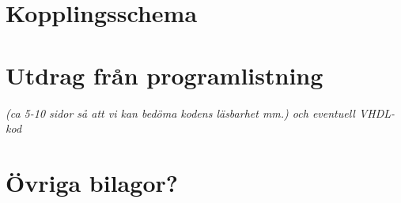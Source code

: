\section{Kopplingsschema}

\section{Utdrag från programlistning}
\emph{(ca 5-10 sidor så att vi kan bedöma kodens läsbarhet mm.) och eventuell VHDL-kod}
\section{Övriga bilagor?}
